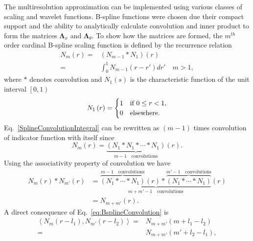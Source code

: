 \documentclass[journal,a4paper]{IEEEtran}
\begin{document}
The multiresolution approximation can be implemented using various classes of scaling and wavelet functions. B-spline functions were chosen due their compact support and the ability to analytically calculate convolution and inner product to form the matrices $ \boldsymbol\Lambda_x$ and $\boldsymbol \Lambda_{\theta}$. To show how the matrices are formed, the $m^{th}$ order cardinal B-spline scaling function is defined by the recurrence relation \cite{Chui1992} 
\begin{align}
N_{m}\left(r\right)=&\left(N_{m-1}\ast N_{1}\right)\left(r\right)\nonumber \\
=&\int_0^{1} N_{m-1}\left( r-r'\right)dr' \quad m>1,
\label{SplineConvolutionIntegral}
\end{align}
where $\ast$ denotes convolution and $N_1\left(s\right)$ is the characteristic function of the unit interval $\left[ 0,1\right)$
\begin{equation}
N_{1}\left(r\right)=
\begin{cases}
1 & \text{if $ 0\le r<1$}, \\
0 & \mathrm{elsewhere}.
\end{cases}
\end{equation}
Eq.~\ref{SplineConvolutionIntegral} can be rewritten as $(m-1)$ times convolution of indicator function with itself since
\begin{equation}
 N_{m}\left(r\right)=\underbrace{\left(N_{1}\ast N_{1}\ast \cdots \ast N_{1}\right)}_{m-1\quad \text{convolutions}}\left(r\right).
\end{equation}
Using the associativity property of convolution we have
\setlength{\arraycolsep}{0.0em}
\begin{align}\label{eq:BsplineConvolution}
N_{m}\left( r\right) \ast N_{m'}\left(r\right)&=\underbrace{\overbrace{\left(N_{1} \ast \cdots \ast N_{1}\right)}^{m-1 \quad \text{convolutions}}\left(r\right) \ast \overbrace{\left(N_{1} \ast \cdots \ast N_{1}\right)}^{m'-1\quad \text{convolutions}}}_{m+m'-1 \quad \text{convolutions}}\left(r\right)\nonumber\\
&=N_{m+m'}\left(r\right).
\end{align}
A direct consequence of Eq.~\eqref{eq:BsplineConvolution} is 
\begin{align}
 \left\langle N_{m}\left(r-l_{1}\right), N_{m'}\left(r-l_{2}\right)\right\rangle=&N_{m+m'}\left(m+l_{1}-l_{2}\right)\nonumber \\
=&N_{m+m'}\left(m'+l_{2}-l_{1}\right),
\label{eq:BsplineInnerProduct}
\end{align}
\end{document}

